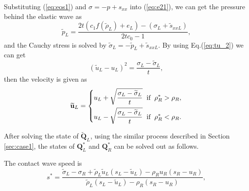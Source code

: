 \documentclass[review]{elsarticle}
\begin{document}
Substituting (\ref{eq:eos1}) and $\sigma=-p +s_{xx}$ into (\ref{eq:e21}), we can get the pressure behind the elastic wave as
\begin{equation}
  \widetilde{p}_L= \frac{2t(c_1f(\widetilde{\rho}_L)+e_L)-(\sigma_L+\widetilde{s}_{xxL})}{2tc_0-1},
\end{equation}
and the Cauchy stress is solved by $\widetilde{\sigma}_L = -\widetilde{p}_L+\widetilde{s}_{xxL}$. By using Eq.(\ref{eq:tu_2}) we can get
\begin{equation}
  (\widetilde{u}_L-u_L)^2 = \frac{\sigma_L-\widetilde{\sigma}_L}{t},
\end{equation}
then the velocity is given as
\begin{equation}
  \widetilde{\mathbf{u}}_L= \left\{
  \begin{aligned}
    u_L+\sqrt{\frac{\sigma_L-\widetilde{\sigma}_L}{t}} \hspace{0.2cm} \text{if} \hspace{0.2cm} \rho_R^* >\rho_R,\\
    u_L-\sqrt{\frac{\sigma_L-\widetilde{\sigma}_L}{t}} \hspace{0.2cm} \text{if} \hspace{0.2cm} \rho_R^* <\rho_R.\\
\end{aligned} \right.
\end{equation}

After solving  the state of $\widetilde{\mathbf{Q}}_L$,  using the similar process described in Section \ref{sec:case1}, the states of $\mathbf{Q}_L^*$ and $\mathbf{Q}_R^*$ can be solved  out as follows.

The contact wave speed is
\begin{equation}
  s^* = \frac{\widetilde{\sigma}_L-\sigma_R+\widetilde{\rho}_L \widetilde{u}_L(s_L-\widetilde{u}_L)-\rho_R u_R(s_R-u_R)}{\widetilde{\rho}_L(s_L-\widetilde{u}_L)-\rho_R(s_R-u_R)},
\end{equation}
\end{document}
